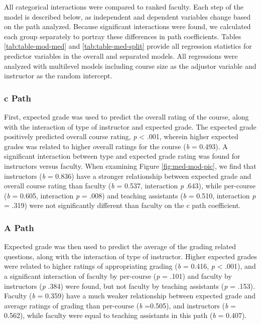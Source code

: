 \documentclass[man]{apa6}
\theoremstyle{definition}
\theoremstyle{definition}
\theoremstyle{definition}
\theoremstyle{remark}
\begin{document}
All categorical interactions were compared to ranked faculty. Each step
of the model is described below, as independent and dependent variables
change based on the path analyzed. Because significant interactions were
found, we calculated each group separately to portray these differences
in path coefficients. Tables \ref{tab:table-mod-med} and
\ref{tab:table-med-split} provide all regression statistics for
predictor variables in the overall and separated models. All regressions
were analyzed with multilevel models including course size as the
adjustor variable and instructor as the random intercept.

\subsubsection{c Path}\label{c-path}

First, expected grade was used to predict the overall rating of the
course, along with the interaction of type of instructor and expected
grade. The expected grade positively predicted overall course rating,
\emph{p} \textless{} .001, wherein higher expected grades was related to
higher overall ratings for the course (\emph{b} = 0.493). A significant
interaction between type and expected grade rating was found for
instructors versus faculty. When examining Figure \ref{fig:med-mod-pic},
we find that instructors (\emph{b} = 0.836) have a stronger relationship
between expected grade and overall course rating than faculty (\emph{b}
= 0.537, interaction \emph{p} .643), while per-course (\emph{b} = 0.605,
interaction \emph{p} = .008) and teaching assistants (\emph{b} = 0.510,
interaction \emph{p} = .319) were not significantly different than
faculty on the c path coefficient.

\subsubsection{A Path}\label{a-path}

Expected grade was then used to predict the average of the grading
related questions, along with the interaction of type of instructor.
Higher expected grades were related to higher ratings of appropriating
grading (\emph{b} = 0.416, \emph{p} \textless{} .001), and a significant
interaction of faculty by per-course (\emph{p} = .101) and faculty by
instructors (\emph{p} .384) were found, but not faculty by teaching
assistants (\emph{p} = .153). Faculty (\emph{b} = 0.359) have a much
weaker relationship between expected grade and average ratings of
grading than per-course (\emph{b} =0.505), and instructors (\emph{b} =
0.562), while faculty were equal to teaching assistants in this path
(\emph{b} = 0.407).
\end{document}
